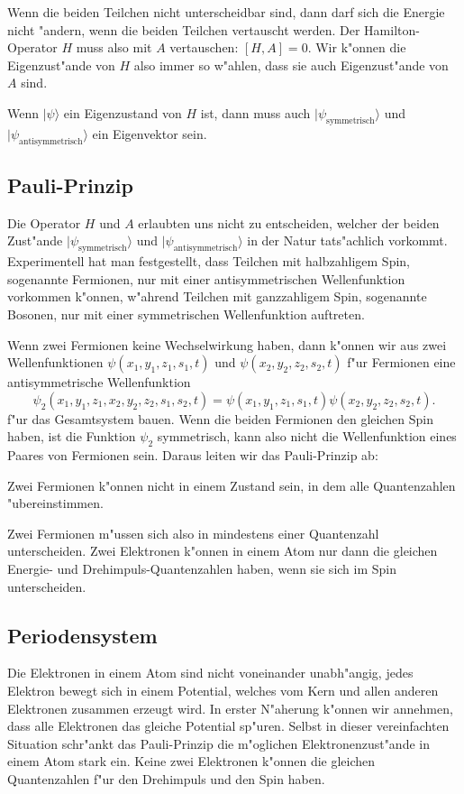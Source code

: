 Wenn die beiden Teilchen nicht unterscheidbar sind, dann darf sich
die Energie nicht "andern, wenn die beiden Teilchen vertauscht
werden. Der Hamilton-Operator $H$ muss also mit $A$ vertauschen:
$[H,A]=0$. Wir k"onnen die Eigenzust"ande von $H$ also immer so
w"ahlen, dass sie auch Eigenzust"ande von $A$ sind.

Wenn $|\psi\rangle$ ein Eigenzustand von $H$ ist, dann muss auch
$|\psi_{\text{symmetrisch}}\rangle$ und
$|\psi_{\text{antisymmetrisch}}\rangle$ ein Eigenvektor sein.

\subsection{Pauli-Prinzip}
%
Die Operator $H$ und $A$ erlaubten uns nicht zu entscheiden, welcher
der beiden Zust"ande $|\psi_{\text{symmetrisch}}\rangle$ und
$|\psi_{\text{antisymmetrisch}}\rangle$ in der Natur tats"achlich
vorkommt.
Experimentell hat man festgestellt, dass Teilchen mit halbzahligem
Spin, sogenannte Fermionen, nur mit einer antisymmetrischen
%
Wellenfunktion vorkommen k"onnen, w"ahrend Teilchen mit
ganzzahligem Spin, sogenannte Bosonen, nur mit einer symmetrischen
Wellenfunktion auftreten.
%

Wenn zwei Fermionen keine Wechselwirkung haben, dann k"onnen wir
aus zwei Wellenfunktionen
$\psi(x_1,y_1,z_1,s_1,t)$
und
$\psi(x_2,y_2,z_2,s_2,t)$
f"ur Fermionen eine antisymmetrische Wellenfunktion
\[
\psi_2(x_1,y_1,z_1,x_2,y_2,z_2,s_1,s_2,t)
=
\psi(x_1,y_1,z_1,s_1,t)
\psi(x_2,y_2,z_2,s_2,t).
\]
f"ur das Gesamtsystem bauen.
Wenn die beiden Fermionen den gleichen Spin haben, ist die
Funktion $\psi_2$ symmetrisch, kann also nicht die Wellenfunktion
eines Paares von Fermionen sein. 
Daraus leiten wir das Pauli-Prinzip ab:

\begin{satz}
Zwei Fermionen k"onnen nicht in einem Zustand sein, in dem alle
Quantenzahlen "ubereinstimmen.
\end{satz}
Zwei Fermionen m"ussen sich also in mindestens einer Quantenzahl
unterscheiden.
Zwei Elektronen k"onnen in einem Atom nur dann die gleichen
Energie- und Drehimpuls-Quantenzahlen haben, wenn sie sich im
Spin unterscheiden.

\subsection{Periodensystem}
%
Die Elektronen in einem Atom sind nicht voneinander unabh"angig,
jedes Elektron bewegt sich in einem Potential, welches vom Kern
und allen anderen Elektronen zusammen erzeugt wird.
In erster N"aherung k"onnen wir annehmen, dass alle Elektronen
das gleiche Potential sp"uren.
Selbst in dieser vereinfachten Situation schr"ankt das Pauli-Prinzip
die m"oglichen Elektronenzust"ande in einem Atom stark ein.
Keine zwei Elektronen k"onnen die gleichen Quantenzahlen f"ur
den Drehimpuls und den Spin haben.

